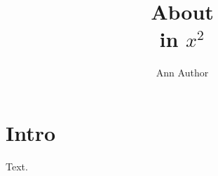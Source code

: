 \documentclass{article}
\title{About \nm\\[2pt] in\hspace{1em}{\large Space} $x^2$}
\author{Ann Author}
\begin{document}
\begin{center}\@title\end{center}
\maketitle
\section{Intro}
Text.
\end{document}
